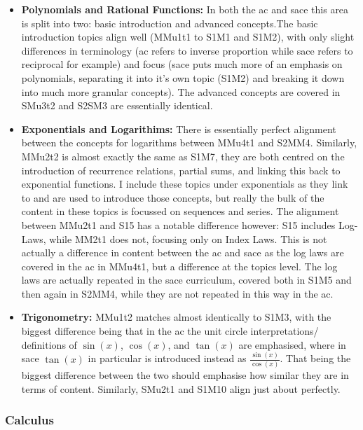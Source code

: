 \documentclass[twoside,12pt,a4paper]{report}
\begin{document}
\begin{itemize}
	\item \textbf{Polynomials and Rational Functions:} In both the \gls{ac} and \gls{sace} this area is split into two: basic introduction and advanced concepts.The basic introduction topics align well (MMu1t1 to S1M1 and S1M2), with only slight differences in terminology (\gls{ac} refers to inverse proportion while \gls{sace} refers to reciprocal for example) and focus (\gls{sace} puts much more of an emphasis on polynomials, separating it into it's own topic (S1M2) and breaking it down into much more granular concepts). The advanced concepts are covered in SMu3t2 and S2SM3 are essentially identical.
	\item \textbf{Exponentials and Logarithims:} There is essentially perfect alignment between the concepts for logarithms between MMu4t1 and S2MM4. Similarly, MMu2t2 is almost exactly the same as S1M7, they are both centred on the introduction of recurrence relations, partial sums, and linking this back to exponential functions. I include these topics under exponentials as they link to and are used to introduce those concepts, but really the bulk of the content in these topics is focussed on sequences and series. The alignment between MMu2t1 and S15 has a notable difference however: S15 includes Log-Laws, while MM2t1 does not, focusing only on Index Laws. This is not actually a difference in content between the \gls{ac} and \gls{sace} as the log laws are covered in the \gls{ac} in MMu4t1, but a difference at the topics level. The log laws are actually repeated in the \gls{sace} curriculum, covered both in S1M5 and then again in S2MM4, while they are not repeated in this way in the \gls{ac}.
			\item \textbf{Trigonometry:} MMu1t2 matches almost identically to S1M3, with the biggest difference being that in the \gls{ac} the unit circle interpretations/ definitions of $\sin(x)$, $\cos(x)$, and $\tan(x)$ are emphasised, where in \gls{sace} $\tan(x)$ in particular is introduced instead as $\frac{\sin(x)}{\cos(x)}$. That being the biggest difference between the two should emphasise how similar they are in terms of content. Similarly, SMu2t1 and S1M10 align just about perfectly. 
\end{itemize}

\subsubsection{Calculus}
\end{document}
